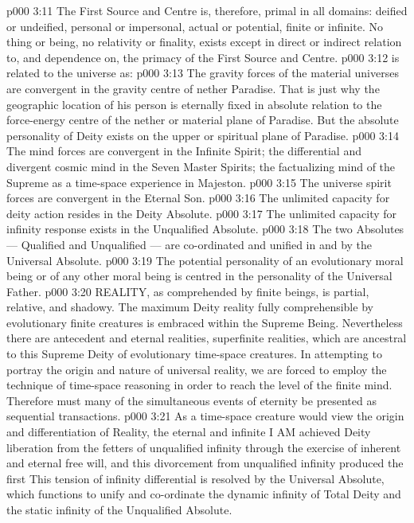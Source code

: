 \vs p000 3:11 The First Source and Centre is, therefore, primal in all domains: deified or undeified, personal or impersonal, actual or potential, finite or infinite. No thing or being, no relativity or finality, exists except in direct or indirect relation to, and dependence on, the primacy of the First Source and Centre.
\vs p000 3:12 \pc {} is related to the universe as:
\vs p000 3:13 \bibnobreakspace The gravity forces of the material universes are convergent in the gravity centre of nether Paradise. That is just why the geographic location of his person is eternally fixed in absolute relation to the force\hyp{}energy centre of the nether or material plane of Paradise. But the absolute personality of Deity exists on the upper or spiritual plane of Paradise.
\vs p000 3:14 \bibnobreakspace The mind forces are convergent in the Infinite Spirit; the differential and divergent cosmic mind in the Seven Master Spirits; the factualizing mind of the Supreme as a time\hyp{}space experience in Majeston.
\vs p000 3:15 \bibnobreakspace The universe spirit forces are convergent in the Eternal Son.
\vs p000 3:16 \bibnobreakspace The unlimited capacity for deity action resides in the Deity Absolute.
\vs p000 3:17 \bibnobreakspace The unlimited capacity for infinity response exists in the Unqualified Absolute.
\vs p000 3:18 \bibnobreakspace The two Absolutes --- Qualified and Unqualified --- are co\hyp{}ordinated and unified in and by the Universal Absolute.
\vs p000 3:19 \bibnobreakspace The potential personality of an evolutionary moral being or of any other moral being is centred in the personality of the Universal Father.
\vs p000 3:20 \pc REALITY, as comprehended by finite beings, is partial, relative, and shadowy. The maximum Deity reality fully comprehensible by evolutionary finite creatures is embraced within the Supreme Being. Nevertheless there are antecedent and eternal realities, superfinite realities, which are ancestral to this Supreme Deity of evolutionary time\hyp{}space creatures. In attempting to portray the origin and nature of universal reality, we are forced to employ the technique of time\hyp{}space reasoning in order to reach the level of the finite mind. Therefore must many of the simultaneous events of eternity be presented as sequential transactions.
\vs p000 3:21 As a time\hyp{}space creature would view the origin and differentiation of Reality, the eternal and infinite I AM achieved Deity liberation from the fetters of unqualified infinity through the exercise of inherent and eternal free will, and this divorcement from unqualified infinity produced the first  This tension of infinity differential is resolved by the Universal Absolute, which functions to unify and co\hyp{}ordinate the dynamic infinity of Total Deity and the static infinity of the Unqualified Absolute.
